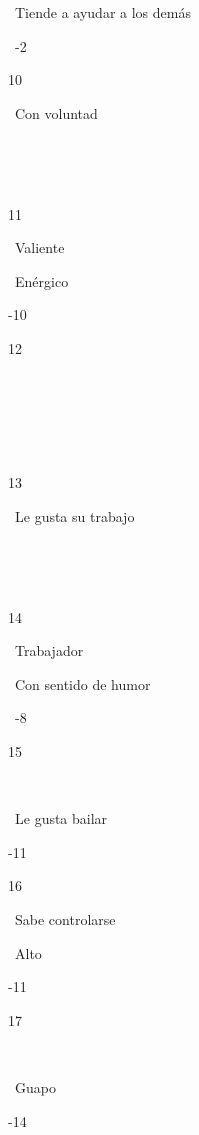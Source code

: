 ~Tiende a ayudar a los demás

~-2

10

~Con voluntad

~

~

11

~Valiente

~Enérgico

-10

12

~

~

~

13

~Le gusta su trabajo

~

~

14

~Trabajador

~Con sentido de humor

~-8

15

~

~Le gusta bailar

-11

16

~Sabe controlarse

~Alto

-11

17

~

~Guapo

-14


